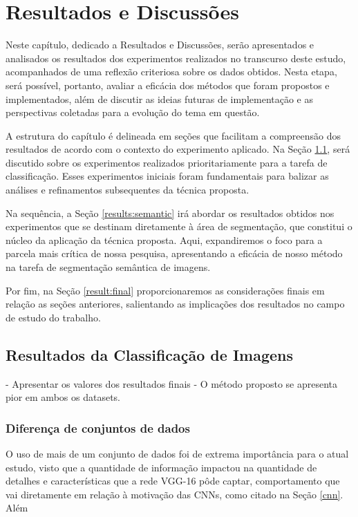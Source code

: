 \newpage
\clearpage

\section{Resultados e Discussões}
\label{results}
Neste capítulo, dedicado a Resultados e Discussões, serão apresentados e analisados os resultados dos experimentos realizados no transcurso deste estudo, acompanhados de uma reflexão criteriosa sobre os dados obtidos. Nesta etapa, será possível, portanto, avaliar a eficácia dos métodos que foram propostos e implementados, além de discutir as ideias futuras de implementação e as perspectivas coletadas para a evolução do tema em questão.

A estrutura do capítulo é delineada em seções que facilitam a compreensão dos resultados de acordo com o contexto do experimento aplicado. Na Seção \ref{results:class}, será discutido sobre os experimentos realizados prioritariamente para a tarefa de classificação. Esses experimentos iniciais foram fundamentais para balizar as análises e refinamentos subsequentes da técnica proposta.

Na sequência, a Seção \ref{results:semantic} irá abordar os resultados obtidos nos experimentos que se destinam diretamente à área de segmentação, que constitui o núcleo da aplicação da técnica proposta. Aqui, expandiremos o foco para a parcela mais crítica de nossa pesquisa, apresentando a eficácia de nosso método na tarefa de segmentação semântica de imagens.

Por fim, na Seção \ref{result:final} proporcionaremos as considerações finais em relação as seções anteriores, salientando as implicações dos resultados no campo de estudo do trabalho.

\subsection{Resultados da Classificação de Imagens}
\label{results:class}
- Apresentar os valores dos resultados finais
- O método proposto se apresenta pior em ambos os datasets.

\subsubsection{Diferença de conjuntos de dados}
\label{results:class:datasets}
O uso de mais de um conjunto de dados foi de extrema importância para o atual estudo, visto que a quantidade de informação impactou na quantidade de detalhes e características que a rede VGG-16 pôde captar, comportamento que vai diretamente em relação à motivação das CNNs, como citado na Seção \ref{cnn}. Além 

